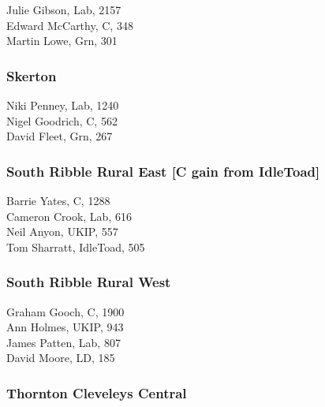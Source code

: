 \documentclass[a4paper,openany,10pt]{book}
\begin{document}


Julie Gibson, Lab, 2157\\
Edward McCarthy, C, 348\\
Martin Lowe, Grn, 301\\


\subsubsection*{Skerton}



Niki Penney, Lab, 1240\\
Nigel Goodrich, C, 562\\
David Fleet, Grn, 267\\


\subsubsection*{South Ribble Rural East \hspace*{\fill}\nolinebreak[1]%
\enspace\hspace*{\fill}
[C gain from IdleToad]}



Barrie Yates, C, 1288\\
Cameron Crook, Lab, 616\\
Neil Anyon, UKIP, 557\\
Tom Sharratt, IdleToad, 505\\


\subsubsection*{South Ribble Rural West}



Graham Gooch, C, 1900\\
Ann Holmes, UKIP, 943\\
James Patten, Lab, 807\\
David Moore, LD, 185\\


\subsubsection*{Thornton Cleveleys Central}
\end{document}
